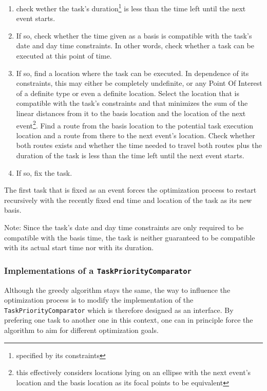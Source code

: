 \begin{enumerate}

	\item check wether the task's duration\footnote{specified by its constraints} is less than the time left until the next event starts.
	\item If so, check whether the time given as a basis is compatible with the task's date and day time constraints. In other words, check whether a task can be executed at this point of time.
	\item If so, find a location where the task can be executed. In dependence of its constraints, this may either be completely undefinite, or any Point Of Interest of a definite type or even a definite location. Select the location that is compatible with the task's constraints and that minimizes the sum of the linear distances from it to the basis location and the location of the next event\footnote{this effectively considers locations lying on an ellipse with the next event's location and the basis location as its focal  points to be equivalent}. Find a route from the basis location to the potential task execution location and a route from there to the next event's location. Check whether both routes exists and whether the time needed to travel both routes plus the duration of the task is less than the time left until the next event starts.
	\item If so, fix the task.

\end{enumerate}

The first task that is fixed as an event forces the optimization process to restart recursively with the recently fixed end time and location of the task as its new basis.\newline

Note: Since the task's date and day time constraints are only required to be compatible with the basis time, the task is neither guaranteed to be compatible with its actual start time nor with its duration.

\subsubsection{Implementations of a \texttt{TaskPriorityComparator}}

Although the greedy algorithm stays the same, the way to influence the optimization process is to modify the implementation of the \texttt{TaskPriorityComparator} which is therefore designed as an interface. By prefering one task to another one in this context, one can in principle force the algorithm to aim for different optimization goals.\newline

